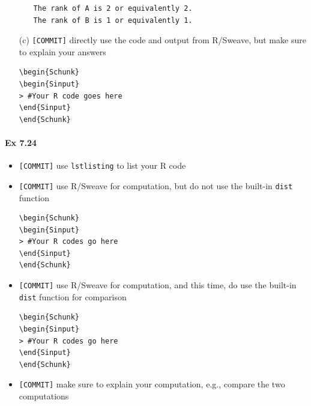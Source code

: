 \documentclass[12pt]{article}
\begin{document}
\begin{itemize}
\begin{itemize}
\begin{lstlisting}
The rank of A is 2 or equivalently 2.
The rank of B is 1 or equivalently 1.
\end{lstlisting}
        \end{itemize}
    \item[(c)] \verb+[COMMIT]+   directly use the code and output from R/Sweave, but make sure
        to explain your answers
\begin{lstlisting}
\begin{Schunk}
\begin{Sinput}
> #Your R code goes here
\end{Sinput}
\end{Schunk}
\end{lstlisting}
\end{itemize}
\paragraph{Ex 7.24}
\begin{itemize}
    \item \verb+[COMMIT]+ use \verb+lstlisting+ to list your R code
    \item \verb+[COMMIT]+ use R/Sweave for computation, but do not use the built-in \verb+dist+
        function
\begin{lstlisting}
\begin{Schunk}
\begin{Sinput}
> #Your R codes go here
\end{Sinput}
\end{Schunk}
\end{lstlisting}
    \item \verb+[COMMIT]+ use R/Sweave for computation, and this time, do use the built-in \verb+dist+
        function for comparison
\begin{lstlisting}
\begin{Schunk}
\begin{Sinput}
> #Your R codes go here
\end{Sinput}
\end{Schunk}
\end{lstlisting}
    \item \verb+[COMMIT]+ make sure to explain your computation, e.g., compare the two
        computations
\end{itemize}
\end{document}
